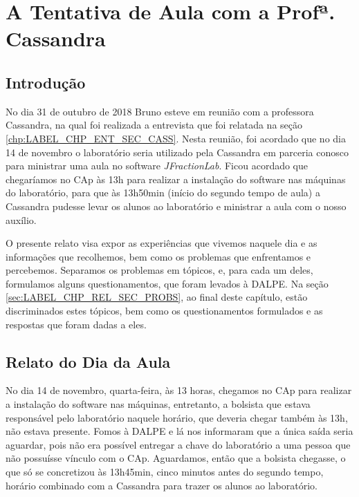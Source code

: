 \chapter{A Tentativa de Aula com a Profª. Cassandra}\label{chp:LABEL_CHP_REL}

\section{Introdução}\label{sec:LABEL_CHP_REL_SEC_INTRO}

No dia 31 de outubro de 2018 Bruno esteve em reunião com a professora Cassandra, na qual foi realizada a entrevista que foi relatada na seção \ref{chp:LABEL_CHP_ENT_SEC_CASS}. Nesta reunião, foi acordado que no dia 14 de novembro o laboratório seria utilizado pela Cassandra em parceria conosco para ministrar uma aula no software \textit{JFractionLab}. Ficou acordado que chegaríamos no CAp às 13h para realizar a instalação do software nas máquinas do laboratório, para que às 13h50min (início do segundo tempo de aula) a Cassandra pudesse levar os alunos ao laboratório e ministrar a aula com o nosso auxílio.

O presente relato visa expor as experiências que vivemos naquele dia e as informações que recolhemos, bem como os problemas que enfrentamos e percebemos. Separamos os problemas em tópicos, e, para cada um deles, formulamos alguns questionamentos, que foram levados à DALPE. Na seção \ref{sec:LABEL_CHP_REL_SEC_PROBS}, ao final deste capítulo, estão discriminados estes tópicos, bem como os questionamentos formulados e as respostas que foram dadas a eles.

\section{Relato do Dia da Aula}\label{sec:LABEL_CHP_REL_SEC_REL}


No dia 14 de novembro, quarta-feira, às 13 horas, chegamos no CAp para realizar a instalação do software nas máquinas, entretanto, a bolsista que estava responsável pelo laboratório naquele horário, que deveria chegar também às 13h, não estava presente. Fomos à DALPE e lá nos informaram que a única saída seria aguardar, pois não era possível entregar a chave do laboratório a uma pessoa que não possuísse vínculo com o CAp. Aguardamos, então que a bolsista chegasse, o que só se concretizou às 13h45min, cinco minutos antes do segundo tempo, horário combinado com a Cassandra para trazer os alunos ao laboratório.

